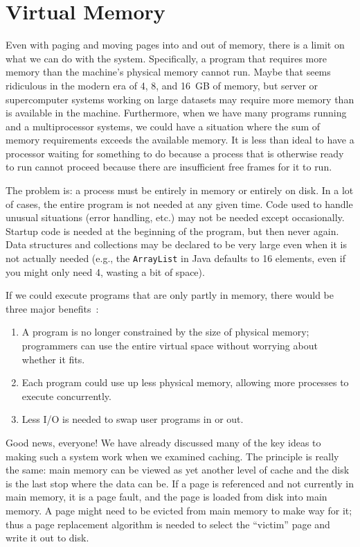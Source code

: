 




\section*{Virtual Memory}
Even with paging and moving pages into and out of memory, there is a limit on what we can do with the system. Specifically, a program that requires more memory than the machine's physical memory cannot run. Maybe that seems ridiculous in the modern era of 4, 8, and 16~GB of memory, but server or supercomputer systems working on large datasets may require more memory than is available in the machine. Furthermore, when we have many programs running and a multiprocessor systems, we could have a situation where the sum of memory requirements exceeds the available memory. It is less than ideal to have a processor waiting for something to do because a process that is otherwise ready to run cannot proceed because there are insufficient free frames for it to run.

The problem is: a process must be entirely in memory or entirely on disk. In a lot of cases, the entire program is not needed at any given time. Code used to handle unusual situations (error handling, etc.) may not be needed except occasionally. Startup code is needed at the beginning of the program, but then never again. Data structures and collections may be declared to be very large even when it is not actually needed (e.g., the \texttt{ArrayList} in Java defaults to 16 elements, even if you might only need 4, wasting a bit of space).

If we could execute programs that are only partly in memory, there would be three major benefits~\cite{osc}:

\begin{enumerate}
	\item A program is no longer constrained by the size of physical memory; programmers can use the entire virtual space without worrying about whether it fits.
	\item Each program could use up less physical memory, allowing more processes to execute concurrently.
	\item Less I/O is needed to swap user programs in or out.
\end{enumerate}


Good news, everyone!  We have already discussed many of the key ideas to making such a system work when we examined caching. The principle is really the same: main memory can be viewed as yet another level of cache and the disk is the last stop where the data can be. If a page is referenced and not currently in main memory, it is a page fault, and the page is loaded from disk into main memory. A page might need to be evicted from main memory to make way for it; thus a page replacement algorithm is needed to select the ``victim'' page and write it out to disk. 

